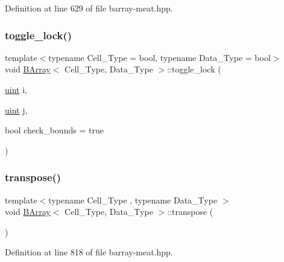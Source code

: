 Definition at line 629 of file barray-\/meat.\+hpp.

\mbox{\label{class_b_array_ac5079b33fc5300dd912cdf85bb51ac53}} 
\subsubsection{\texorpdfstring{toggle\+\_\+lock()}{toggle\_lock()}}
{\footnotesize\ttfamily template$<$typename Cell\+\_\+\+Type = bool, typename Data\+\_\+\+Type = bool$>$ \\
void \hyperlink{class_b_array}{B\+Array}$<$ Cell\+\_\+\+Type, Data\+\_\+\+Type $>$\+::toggle\+\_\+lock (\begin{DoxyParamCaption}\item[{\hyperlink{typedefs_8hpp_a91ad9478d81a7aaf2593e8d9c3d06a14}{uint}}]{i,  }\item[{\hyperlink{typedefs_8hpp_a91ad9478d81a7aaf2593e8d9c3d06a14}{uint}}]{j,  }\item[{bool}]{check\+\_\+bounds = {\ttfamily true} }\end{DoxyParamCaption})}

\mbox{\label{class_b_array_a0284f7f2148b7c1b474ebe01f6548b98}} 
\subsubsection{\texorpdfstring{transpose()}{transpose()}}
{\footnotesize\ttfamily template$<$typename Cell\+\_\+\+Type , typename Data\+\_\+\+Type $>$ \\
void \hyperlink{class_b_array}{B\+Array}$<$ Cell\+\_\+\+Type, Data\+\_\+\+Type $>$\+::transpose (\begin{DoxyParamCaption}{ }\end{DoxyParamCaption})\hspace{0.3cm}{\ttfamily [inline]}}



Definition at line 818 of file barray-\/meat.\+hpp.

\mbox{\label{class_b_array_a0fa473027d00ec53ed08eaea03ac3ef7}} 
